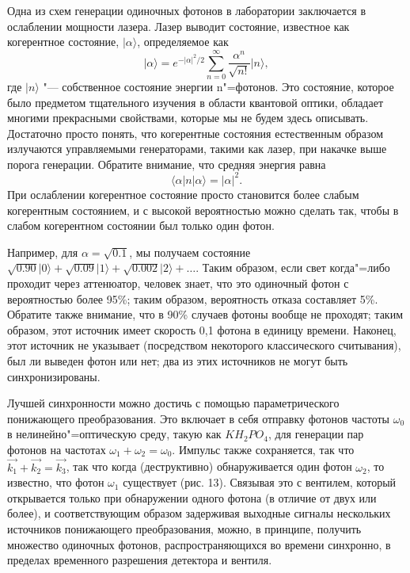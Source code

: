 \begin{multicols}{2}
{        Одна из схем генерации одиночных фотонов в лаборатории заключается в ослаблении мощности
        лазера. Лазер выводит состояние, известное как когерентное состояние, $\vert\alpha\rangle$, определяемое как
        \begin{equation}
            \vert\alpha\rangle=e^{-\vert\alpha\vert^2/2}\sum_{n = 0}^{\infty}  \frac{\alpha^n}{\sqrt{n!}}\vert n\rangle,
        \end{equation}
        где $\vert n\rangle$ "--- собственное состояние энергии n"=фотонов. Это состояние, которое было предметом
        тщательного изучения в области квантовой оптики, обладает многими прекрасными свойствами, которые мы
        не будем здесь описывать. Достаточно просто понять, что когерентные состояния естественным
        образом излучаются управляемыми генераторами, такими как лазер, при накачке выше порога генерации.
        Обратите внимание, что средняя энергия равна
        \begin{equation}
            \langle\alpha\vert n\vert\alpha\rangle=\vert\alpha\vert^2.
        \end{equation}
        При ослаблении когерентное состояние просто
        становится более слабым когерентным состоянием, и с высокой вероятностью можно сделать так, чтобы в слабом когерентном состоянии был только один фотон.

        Например, для $\alpha=\sqrt{0.1}$, мы получаем состояние $\sqrt{0.90}\vert0\rangle+\sqrt{0.09}\vert1\rangle+\sqrt{0.002}\vert2\rangle+\ldots$.
        Таким образом, если свет когда"=либо проходит через аттенюатор, человек знает, что это одиночный фотон с
        вероятностью более 95\%; таким образом, вероятность отказа составляет 5\%. Обратите также внимание, что в 90\%
        случаев фотоны вообще не проходят; таким образом, этот источник имеет скорость 0,1 фотона в единицу
        времени. Наконец, этот источник не указывает (посредством некоторого классического считывания),
        был ли выведен фотон или нет; два из этих источников не могут быть синхронизированы.

        Лучшей синхронности можно достичь с помощью параметрического понижающего преобразования. Это включает
        в себя отправку фотонов частоты $\omega_0$ в нелинейно"=оптическую среду, такую как $KH_2PO_4$, для
        генерации пар фотонов на частотах $\omega_1 + \omega_2 = \omega_0$. Импульс также сохраняется, так что 
        $\vec{k_1}+\vec{k_2}=\vec{k_3}$, так что когда (деструктивно) обнаруживается один фотон $\omega_2$, то 
        известно, что фотон $\omega_1$ существует (рис. 13).  Связывая это с вентилем, который открывается
        только при обнаружении одного фотона (в отличие от двух или более), и соответствующим образом
        задерживая выходные сигналы нескольких источников понижающего преобразования, можно, в принципе, получить
        множество одиночных фотонов, распространяющихся во времени синхронно, в пределах временного разрешения
        детектора и вентиля. 

}
\end{multicols}

